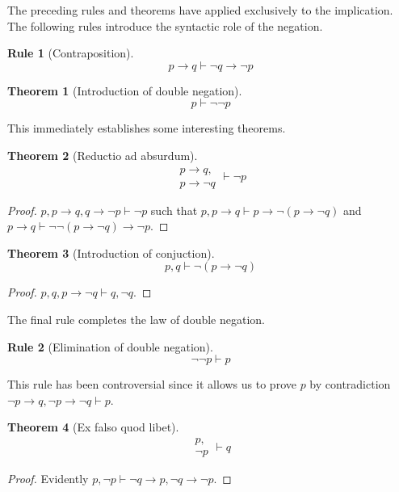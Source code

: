 \documentclass{amsbook}
\newcommand{\infers}{\mathrel\vdash}
\newcommand{\then}{\mathrel\rightarrow}
\theoremstyle{definition}
\newtheorem{frule}{Rule}[section]
\newtheorem{thm}{Theorem}[section]
\begin{document}
The preceding rules and theorems have applied exclusively to the implication. The following rules introduce the syntactic role of the negation.

\begin{frule}[Contraposition]
    $$p \then q \infers \neg q \then \neg p$$
\end{frule}

\begin{thm}[Introduction of double negation]
    $$p \infers \neg\neg p$$
\end{thm}

This immediately establishes some interesting theorems.

\begin{thm}[Reductio ad absurdum]
    $$\begin{aligned}
            p \then q, \\ p \then \neg q
        \end{aligned} \infers \neg p$$
    \begin{proof}
        $p, p \then q, q \then \neg p \infers \neg p$ such that $p, p \then q \infers p \then \neg(p \then \neg q)$ and $p \then q \infers \neg \neg(p \then \neg q) \then \neg p$.
    \end{proof}
\end{thm}

\begin{thm}[Introduction of conjuction]
    $$p, q \infers \neg(p \then \neg q)$$
    \begin{proof}
        $p, q, p \then \neg q \infers q, \neg q$.
    \end{proof}
\end{thm}

The final rule completes the law of double negation.

\begin{frule}[Elimination of double negation]
    $${\neg\neg p} \infers p$$
\end{frule}

This rule has been controversial since it allows us to prove $p$ by contradiction $\neg p \then q, \neg p \then \neg q \infers p$.

\begin{thm}[Ex falso quod libet]
    $$\begin{aligned}
            p, \\ \neg p
        \end{aligned}\infers q$$
    \begin{proof}
        Evidently $p, \neg p \infers \neg q \then p, \neg q \then \neg p$.
    \end{proof}
\end{thm}
\end{document}

